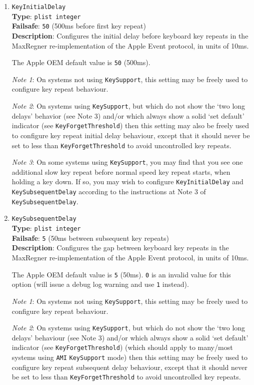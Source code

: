 \documentclass[]{article}
\begin{document}
\begin{enumerate}
\item
  \texttt{KeyInitialDelay}\\
  \textbf{Type}: \texttt{plist\ integer}\\
  \textbf{Failsafe}: \texttt{50} (500ms before first key repeat)\\
  \textbf{Description}: Configures the initial delay before keyboard key repeats in the
  MaxRegner re-implementation of the Apple Event protocol, in units of 10ms.

  The Apple OEM default value is \texttt{50} (500ms).

  \emph{Note 1}: On systems not using \texttt{KeySupport}, this setting may be freely used
  to configure key repeat behaviour.

  \emph{Note 2}: On systems using \texttt{KeySupport}, but which do not show the `two long
  delays' behavior (see Note 3) and/or which always show a solid `set default' indicator (see \texttt{KeyForgetThreshold})
  then this setting may also be freely used to configure key repeat initial delay behaviour,
  except that it should never be set to less than \texttt{KeyForgetThreshold} to avoid
  uncontrolled key repeats.

  \emph{Note 3}: On some systems using \texttt{KeySupport}, you may find that you see
  one additional slow key repeat before normal speed key repeat starts, when holding a
  key down. If so, you may wish to configure \texttt{KeyInitialDelay} and \texttt{KeySubsequentDelay}
  according to the instructions at Note 3 of \texttt{KeySubsequentDelay}.


\item
  \texttt{KeySubsequentDelay}\\
  \textbf{Type}: \texttt{plist\ integer}\\
  \textbf{Failsafe}: \texttt{5} (50ms between subsequent key repeats)\\
  \textbf{Description}: Configures the gap between keyboard key repeats in the MaxRegner re-implementation
  of the Apple Event protocol, in units of 10ms.

  The Apple OEM default value is \texttt{5} (50ms).
  \texttt{0} is an invalid value for this option (will issue a debug log warning and use \texttt{1} instead).

  \emph{Note 1}: On systems not using \texttt{KeySupport}, this setting may be freely used
  to configure key repeat behaviour.

  \emph{Note 2}: On systems using \texttt{KeySupport}, but which do not show the `two long
  delays' behaviour (see Note 3) and/or which always show a solid `set default' indicator
  (see \texttt{KeyForgetThreshold}) (which should apply to many/most systems using \texttt{AMI}
  \texttt{KeySupport} mode) then this setting may be freely used to configure key repeat
  subsequent delay behaviour, except that it should never be set to less than \texttt{KeyForgetThreshold}
  to avoid uncontrolled key repeats.


\end{enumerate}
\end{document}
